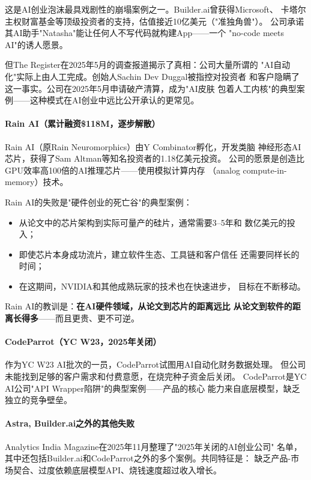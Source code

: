 这是AI创业泡沫最具戏剧性的崩塌案例之一。Builder.ai曾获得Microsoft、
卡塔尔主权财富基金等顶级投资者的支持，估值接近10亿美元（"准独角兽"）。
公司承诺其AI助手"Natasha"能让任何人不写代码就构建App——一个
"no-code meets AI"的诱人愿景。

但The Register在2025年5月的调查报道揭示了真相：公司大量所谓的
"AI自动化"实际上由人工完成。创始人Sachin Dev Duggal被指控对投资者
和客户隐瞒了这一事实。公司在2025年5月申请破产清算，成为"AI皮肤
包着人工内核"的典型案例——这种模式在AI创业中远比公开承认的更常见。

\paragraph{Rain AI（累计融资\$118M，逐步解散）}

Rain AI（原Rain Neuromorphics）由Y Combinator孵化，开发类脑
神经形态AI芯片，获得了Sam Altman等知名投资者的1.18亿美元投资。
公司的愿景是创造比GPU效率高100倍的AI推理芯片——使用模拟计算内存
（analog compute-in-memory）技术。

Rain AI的失败是"硬件创业的死亡谷"的典型案例：
\begin{itemize}
  \item 从论文中的芯片架构到实际可量产的硅片，通常需要3--5年和
    数亿美元的投入；
  \item 即使芯片本身成功流片，建立软件生态、工具链和客户信任
    还需要同样长的时间；
  \item 在这期间，NVIDIA和其他成熟玩家的技术也在快速进步，
    目标在不断移动。
\end{itemize}

Rain AI的教训是：\textbf{在AI硬件领域，从论文到芯片的距离远比
从论文到软件的距离长得多}——而且更贵、更不可逆。

\paragraph{CodeParrot（YC W23，2025年关闭）}

作为YC W23 AI批次的一员，CodeParrot试图用AI自动化财务数据处理。
但公司未能找到足够的客户需求和付费意愿，在烧完种子资金后关闭。
CodeParrot是YC AI公司"API Wrapper陷阱"的典型案例——产品的核心
能力来自底层模型，缺乏独立的竞争壁垒。

\paragraph{Astra, Builder.ai之外的其他失败}

Analytics India Magazine在2025年11月整理了"2025年关闭的AI创业公司"
名单，其中还包括Builder.ai和CodeParrot之外的多个案例。共同特征是：
缺乏产品-市场契合、过度依赖底层模型API、烧钱速度超过收入增长。

